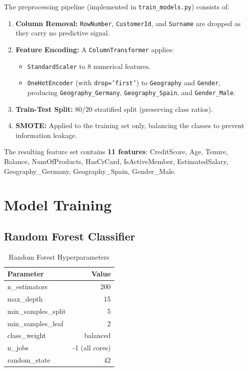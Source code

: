 \documentclass[12pt, a4paper]{report}
\begin{document}
The preprocessing pipeline (implemented in \texttt{train\_models.py}) consists of:

\begin{enumerate}
    \item \textbf{Column Removal:} \texttt{RowNumber}, \texttt{CustomerId}, and \texttt{Surname} are dropped as they carry no predictive signal.
    \item \textbf{Feature Encoding:} A \texttt{ColumnTransformer} applies:
    \begin{itemize}
        \item \texttt{StandardScaler} to 8 numerical features.
        \item \texttt{OneHotEncoder} (with \texttt{drop='first'}) to \texttt{Geography} and \texttt{Gender}, producing \texttt{Geography\_Germany}, \texttt{Geography\_Spain}, and \texttt{Gender\_Male}.
    \end{itemize}
    \item \textbf{Train-Test Split:} 80/20 stratified split (preserving class ratios).
    \item \textbf{SMOTE:} Applied to the training set only, balancing the classes to prevent information leakage.
\end{enumerate}

The resulting feature set contains \textbf{11 features}: CreditScore, Age, Tenure, Balance, NumOfProducts, HasCrCard, IsActiveMember, EstimatedSalary, Geography\_Germany, Geography\_Spain, Gender\_Male.

\section{Model Training}

\subsection{Random Forest Classifier}

\begin{table}[H]
\centering
\caption{Random Forest Hyperparameters}
\label{tab:rf_params}
\begin{tabular}{l r}
\toprule
\textbf{Parameter} & \textbf{Value} \\
\midrule
n\_estimators & 200 \\
max\_depth & 15 \\
min\_samples\_split & 5 \\
min\_samples\_leaf & 2 \\
class\_weight & balanced \\
n\_jobs & -1 (all cores) \\
random\_state & 42 \\
\bottomrule
\end{tabular}
\end{table}
\end{document}
